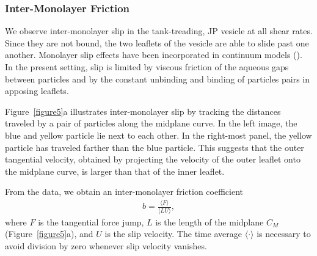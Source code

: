 \documentclass[lineno]{jfm}
\begin{document}
\subsubsection{Inter-Monolayer Friction}
We observe inter-monolayer slip in the tank-treading, JP vesicle at all
shear rates. Since they are not bound, the two leaflets of the vesicle
are able to slide past one another. 
Monolayer slip effects have been incorporated in continuum models (\cite{sch-vla-mik2010}).
In the present setting, slip is limited by viscous
friction of the aqueous gaps between particles and by the constant
unbinding and binding of particles pairs in apposing leaflets. 


Figure~\ref{figure5}a illustrates inter-monolayer slip by tracking the distances
traveled by a pair of particles along the midplane curve. In the left image, the blue and yellow
particle lie next to each other. In the right-most panel, the yellow
particle has traveled farther than the blue particle. This suggests that
the outer tangential velocity, obtained by projecting the velocity of the
outer leaflet onto the midplane curve, 
is larger than that of the inner leaflet. 

From the data, we obtain an inter-monolayer friction coefficient 
\begin{align}
  b =  \frac{\langle F \rangle}{\langle L   U \rangle} ,
\end{align}
where $F$ is the tangential force jump, $L$ is the length of the
midplane $C_M$ (Figure~\ref{figure5}a), and $U$ is the slip velocity.
The time average $\langle \cdot \rangle$ is necessary to avoid division by zero
whenever slip velocity vanishes.  

\end{document}
